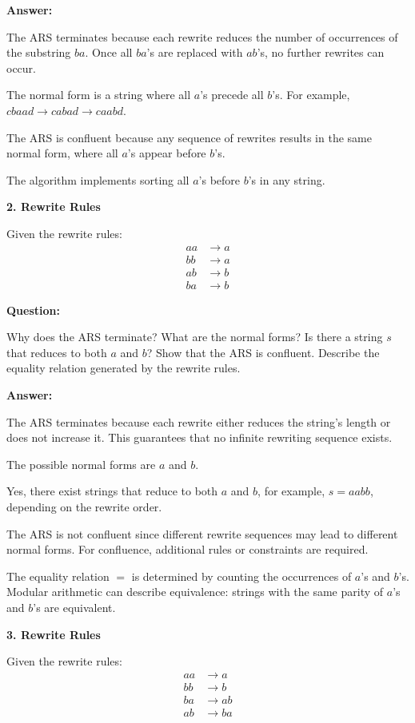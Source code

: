 \documentclass{article}
\theoremstyle{theorem}
\theoremstyle{definition}
\theoremstyle{remark}
\begin{document}
{\textbf{Answer:}

The ARS terminates because each rewrite reduces the number of occurrences of the substring \( ba \). Once all \( ba \)'s are replaced with \( ab \)'s, no further rewrites can occur.

The normal form is a string where all \( a \)'s precede all \( b \)'s. For example, \( cbaad \to cabad \to caabd \).

The ARS is confluent because any sequence of rewrites results in the same normal form, where all \( a \)'s appear before \( b \)'s.

The algorithm implements sorting all \( a \)'s before \( b \)'s in any string.

\textbf{2. Rewrite Rules}

Given the rewrite rules:
\[
\begin{aligned}
    aa &\to a \\
    bb &\to a \\
    ab &\to b \\
    ba &\to b
\end{aligned}
\]

\textbf{Question:}

Why does the ARS terminate? What are the normal forms? Is there a string \( s \) that reduces to both \( a \) and \( b \)? Show that the ARS is confluent. Describe the equality relation generated by the rewrite rules.

\textbf{Answer:}

The ARS terminates because each rewrite either reduces the string's length or does not increase it. This guarantees that no infinite rewriting sequence exists.

The possible normal forms are \( a \) and \( b \).

Yes, there exist strings that reduce to both \( a \) and \( b \), for example, \( s = aabb \), depending on the rewrite order.

The ARS is not confluent since different rewrite sequences may lead to different normal forms. For confluence, additional rules or constraints are required.

The equality relation \( = \) is determined by counting the occurrences of \( a \)'s and \( b \)'s. Modular arithmetic can describe equivalence: strings with the same parity of \( a \)'s and \( b \)'s are equivalent.

\textbf{3. Rewrite Rules}

Given the rewrite rules:
\[
\begin{aligned}
    aa &\to a \\
    bb &\to b \\
    ba &\to ab \\
    ab &\to ba
\end{aligned}
\]

}
\end{document}
